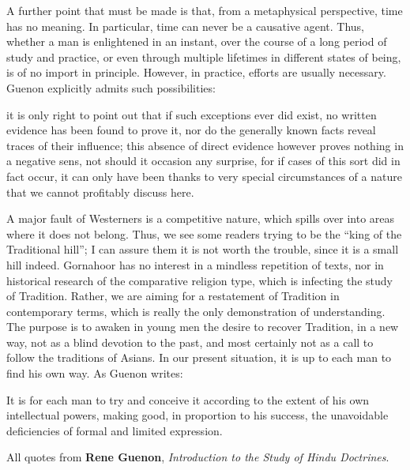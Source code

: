 A further point that must be made is that, from a metaphysical perspective, time has no meaning. In particular, time can never be a causative agent. Thus, whether a man is enlightened in an instant, over the course of a long period of study and practice, or even through multiple lifetimes in different states of being, is of no import in principle. However, in practice, efforts are usually necessary. Guenon explicitly admits such possibilities:

\begin{quotex}
it is only right to point out that if such exceptions ever did exist, no written evidence has been found to prove it, nor do the generally known facts reveal traces of their influence; this absence of direct evidence however proves nothing in a negative sens, not should it occasion any surprise, for if cases of this sort did in fact occur, it can only have been thanks to very special circumstances of a nature that we cannot profitably discuss here.
\end{quotex}


A major fault of Westerners is a competitive nature, which spills over into areas where it does not belong. Thus, we see some readers trying to be the ``king of the Traditional hill''; I can assure them it is not worth the trouble, since it is a small hill indeed. Gornahoor has no interest in a mindless repetition of texts, nor in historical research of the comparative religion type, which is infecting the study of Tradition. Rather, we are aiming for a restatement of Tradition in contemporary terms, which is really the only demonstration of understanding. The purpose is to awaken in young men the desire to recover Tradition, in a new way, not as a blind devotion to the past, and most certainly not as a call to follow the traditions of Asians. In our present situation, it is up to each man to find his own way. As Guenon writes:

\begin{quotex}
It is for each man to try and conceive it according to the extent of his own intellectual powers, making good, in proportion to his success, the unavoidable deficiencies of formal and limited expression.
\end{quotex}

All quotes from \textbf{Rene Guenon}, \emph{Introduction to the Study of Hindu Doctrines}.



